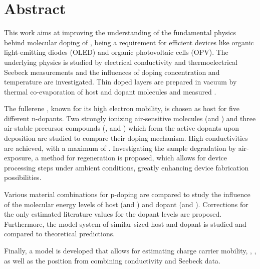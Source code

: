 \vspace*{2cm}
\section*{Abstract}
This work aims at improving the understanding of the fundamental physics behind molecular doping of \OSCs, being a requirement for efficient devices like organic light-emitting diodes (OLED) and organic photovoltaic cells (OPV). The underlying physics is studied by electrical conductivity and thermoelectrical Seebeck measurements and the influences of doping concentration and temperature are investigated. Thin doped layers are prepared in vacuum by thermal co-evaporation of host and dopant molecules and measured \insitu.

The fullerene \CS, known for its high electron mobility, is chosen as host for five different n-dopants. Two strongly ionizing air-sensitive molecules (\CrPd and \WPd) and three air-stable precursor compounds (\aob, \dmbi and \meodmbiI) which form the active dopants upon deposition are studied to compare their doping mechanism.
High conductivities are achieved, with a maximum of .
Investigating the sample degradation by air-exposure, a method for regeneration is proposed, which allows for device processing steps under ambient conditions, greatly enhancing device fabrication possibilities.

Various material combinations for p-doping are compared to study the influence of the molecular energy levels of host (\meo and \lili) and dopant (\FS and \CSF). Corrections for the only estimated literature values for the dopant levels are proposed.
Furthermore, the model system of similar-sized host \pen and dopant \FV is studied and compared to theoretical predictions.

Finally, a model is developed that allows for estimating charge carrier mobility, \nLong, \DopEffLong, as well as the \EtLong position from combining conductivity and Seebeck data.
\newpage
\vspace*{2cm}
